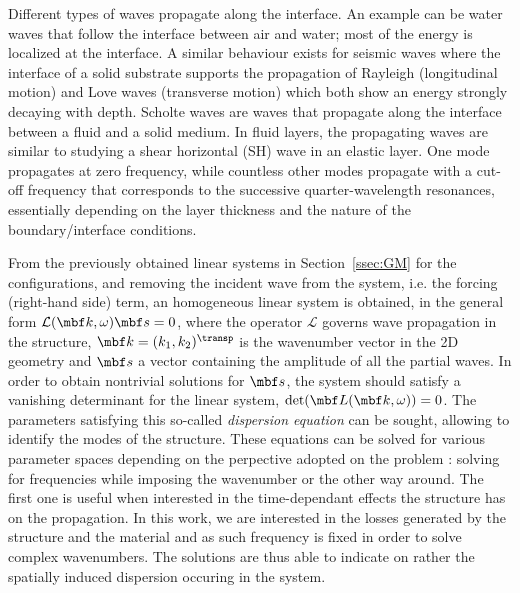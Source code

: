 Different types of waves propagate along the interface. An example can be water waves that follow the interface between air and water; most of the energy is localized at the interface. A similar behaviour exists for seismic waves where the interface of a solid substrate supports the propagation of Rayleigh (longitudinal motion) and Love waves (transverse motion) which both show an energy strongly decaying with depth. Scholte waves are waves that propagate along the interface between a fluid and a solid medium. In fluid layers, the propagating waves are similar to studying a shear horizontal (SH) wave in an elastic layer. One mode propagates at zero frequency, while countless other modes propagate with a cut-off frequency that corresponds to the successive quarter-wavelength resonances, essentially depending on the layer thickness and the nature of the boundary/interface conditions. 

From the previously obtained linear systems in Section~\ref{ssec:GM} for the configurations, and removing the incident wave from the system, i.e. the forcing (right-hand side) term, an homogeneous linear system is obtained, in the general form $\mathcal L(\mbf k, \omega) \mbf s = 0$, where the operator $\mathcal L$ governs wave propagation in the structure, $\mbf k = (k_1, k_2)^\transp$ is the wavenumber vector in the 2D geometry and $\mbf s$ a vector containing the amplitude of all the partial waves. In order to obtain nontrivial solutions for $\mbf s$, the system should satisfy a vanishing determinant for the linear system, $\mathrm{det}(\mbf L (\mbf k, \omega)) = 0$. The parameters satisfying this so-called \emph{dispersion equation} can be sought, allowing to identify the modes of the structure. These equations can be solved for various parameter spaces depending on the perpective adopted on the problem \cite{ducasse2022, deschamps2025}: solving for frequencies while imposing the wavenumber or the other way around. The first one is useful when interested in the time-dependant effects the structure has on the propagation. In this work, we are interested in the losses generated by the structure and the material and as such frequency is fixed in order to solve complex wavenumbers. The solutions are thus able to indicate on rather the spatially induced dispersion occuring in the system.

